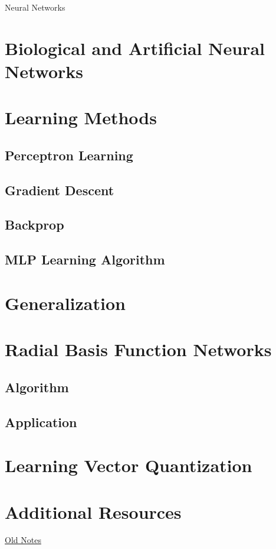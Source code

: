 Neural Networks
\section{Biological and Artificial Neural Networks}
\section{Learning Methods}
\subsection{Perceptron Learning}
\subsection{Gradient Descent}
\subsection{Backprop}
\subsection{MLP Learning Algorithm}
\section{Generalization}
\section{Radial Basis Function Networks}
\subsection{Algorithm}
\subsection{Application}
\section{Learning Vector Quantization}
\section{Additional Resources}
\href{http://www.cs.bham.ac.uk/~jxb/inc.html}{Old Notes}